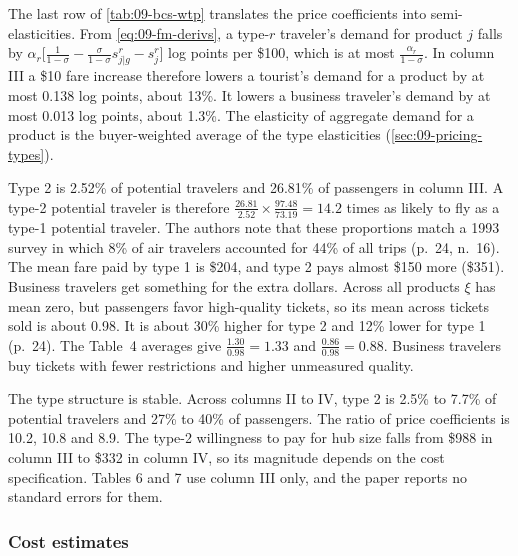 The last row of \cref{tab:09-bcs-wtp} translates the price coefficients into semi-elasticities. From
\eqref{eq:09-fm-derivs}, a type-$r$ traveler's demand for product $j$ falls by
$\alpha_r\big[\frac{1}{1-\sigma}-\frac{\sigma}{1-\sigma}s^r_{j|g}-s^r_j\big]$ log points per \$100, which is
at most $\frac{\alpha_r}{1-\sigma}$. In column III a \$10 fare increase therefore lowers a tourist's demand
for a product by at most 0.138 log points, about 13\%. It lowers a business traveler's demand by at most
0.013 log points, about 1.3\%. The elasticity of
aggregate demand for a product is the buyer-weighted average of the type elasticities
(\cref{sec:09-pricing-types}).

Type 2 is 2.52\% of potential travelers and 26.81\% of passengers in column III. A type-2 potential traveler
is therefore $\frac{26.81}{2.52}\times\frac{97.48}{73.19}=14.2$ times as likely to fly as a type-1
potential traveler. The authors note that these proportions match a 1993
survey in which 8\% of air travelers accounted for 44\% of all trips (p.~24, n.~16). The mean fare paid by
type 1 is \$204, and type 2 pays almost \$150 more (\$351). Business travelers get something for the extra
dollars. Across all products $\xi$ has mean zero, but passengers favor high-quality tickets, so its mean
across tickets sold is about 0.98. It is about 30\% higher for type 2 and 12\% lower for type 1 (p.~24). The
Table~4 averages give $\frac{1.30}{0.98}=1.33$ and $\frac{0.86}{0.98}=0.88$. Business travelers buy tickets
with fewer restrictions and higher unmeasured quality.

The type structure is stable. Across columns II to IV, type 2 is 2.5\% to 7.7\% of potential travelers and
27\% to 40\% of passengers. The ratio of price coefficients is 10.2, 10.8 and 8.9. The type-2 willingness to
pay for hub size falls from \$988 in column III to \$332 in column IV, so its magnitude depends on the cost
specification. Tables 6 and 7 use column III only, and the paper reports no standard errors for them.

\subsubsection{Cost estimates}

